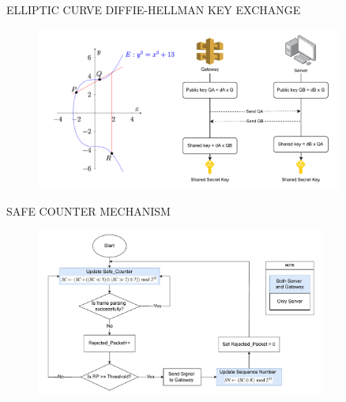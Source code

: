 \begin{frame}{ELLIPTIC CURVE DIFFIE-HELLMAN KEY EXCHANGE}
    \vspace{-0.3cm}
    \begin{figure}
    	\centering
    	\includegraphics[width=0.9\textwidth]{pic/ecdh.pdf}
    \end{figure}
\end{frame}

\begin{frame}{SAFE COUNTER MECHANISM}
\vspace{-0.3cm}
    \begin{figure}
    	\centering
    	\includegraphics[width=0.85\textwidth]{pic/sc.pdf}
    \end{figure}
\end{frame}
